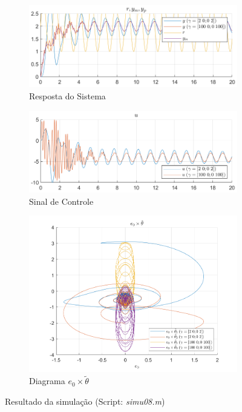 \documentclass[10pt]{article}
\begin{document}
\begin{figure}[h!]
    \begin{subfigure}[b]{0.45\textwidth}
        \centering
        \includegraphics[width=\textwidth]{img/fig08c.png}
        \caption{Resposta do Sistema}
    \end{subfigure}
    \begin{subfigure}[b]{0.45\textwidth}
        \centering
        \includegraphics[width=\textwidth]{img/fig08e.png}
        \caption{Sinal de Controle}
    \end{subfigure}

    \vspace{0.5cm}

    \begin{subfigure}[b]{0.4\textwidth}
        \centering
        \includegraphics[width=\textwidth]{img/fig08d.png}
        \caption{Diagrama $e_0 \times \tilde{\theta}$}
    \end{subfigure}

    \caption{Resultado da simulação (Script: \textit{simu08.m})}
    \label{fig:sim8}
\end{figure}
\end{document}
